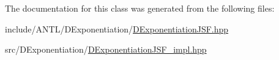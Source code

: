 The documentation for this class was generated from the following files\-:\begin{DoxyCompactItemize}
\item 
include/\-A\-N\-T\-L/\-D\-Exponentiation/\hyperlink{DExponentiationJSF_8hpp}{D\-Exponentiation\-J\-S\-F.\-hpp}\item 
src/\-D\-Exponentiation/\hyperlink{DExponentiationJSF__impl_8hpp}{D\-Exponentiation\-J\-S\-F\-\_\-impl.\-hpp}\end{DoxyCompactItemize}

